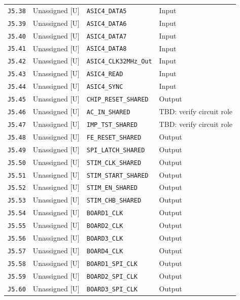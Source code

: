 \documentclass[11pt,a4paper]{article}
\begin{document}
\begin{longtable}{@{}P{21mm}P{34mm}P{78mm}P{33mm}@{}}
\nolinkurl{J5.38} & Unassigned [U] & \nolinkurl{ASIC4_DATA5} & Input \\
\nolinkurl{J5.39} & Unassigned [U] & \nolinkurl{ASIC4_DATA6} & Input \\
\nolinkurl{J5.40} & Unassigned [U] & \nolinkurl{ASIC4_DATA7} & Input \\
\nolinkurl{J5.41} & Unassigned [U] & \nolinkurl{ASIC4_DATA8} & Input \\
\nolinkurl{J5.42} & Unassigned [U] & \nolinkurl{ASIC4_CLK32MHz_Out} & Input \\
\nolinkurl{J5.43} & Unassigned [U] & \nolinkurl{ASIC4_READ} & Input \\
\nolinkurl{J5.44} & Unassigned [U] & \nolinkurl{ASIC4_SYNC} & Input \\
\nolinkurl{J5.45} & Unassigned [U] & \nolinkurl{CHIP_RESET_SHARED} & Output \\
\nolinkurl{J5.46} & Unassigned [U] & \nolinkurl{AC_IN_SHARED} & TBD: verify circuit role \\
\nolinkurl{J5.47} & Unassigned [U] & \nolinkurl{IMP_TST_SHARED} & TBD: verify circuit role \\
\nolinkurl{J5.48} & Unassigned [U] & \nolinkurl{FE_RESET_SHARED} & Output \\
\nolinkurl{J5.49} & Unassigned [U] & \nolinkurl{SPI_LATCH_SHARED} & Output \\
\nolinkurl{J5.50} & Unassigned [U] & \nolinkurl{STIM_CLK_SHARED} & Output \\
\nolinkurl{J5.51} & Unassigned [U] & \nolinkurl{STIM_START_SHARED} & Output \\
\nolinkurl{J5.52} & Unassigned [U] & \nolinkurl{STIM_EN_SHARED} & Output \\
\nolinkurl{J5.53} & Unassigned [U] & \nolinkurl{STIM_CHB_SHARED} & Output \\
\nolinkurl{J5.54} & Unassigned [U] & \nolinkurl{BOARD1_CLK} & Output \\
\nolinkurl{J5.55} & Unassigned [U] & \nolinkurl{BOARD2_CLK} & Output \\
\nolinkurl{J5.56} & Unassigned [U] & \nolinkurl{BOARD3_CLK} & Output \\
\nolinkurl{J5.57} & Unassigned [U] & \nolinkurl{BOARD4_CLK} & Output \\
\nolinkurl{J5.58} & Unassigned [U] & \nolinkurl{BOARD1_SPI_CLK} & Output \\
\nolinkurl{J5.59} & Unassigned [U] & \nolinkurl{BOARD2_SPI_CLK} & Output \\
\nolinkurl{J5.60} & Unassigned [U] & \nolinkurl{BOARD3_SPI_CLK} & Output \\

\end{longtable}
\end{document}
